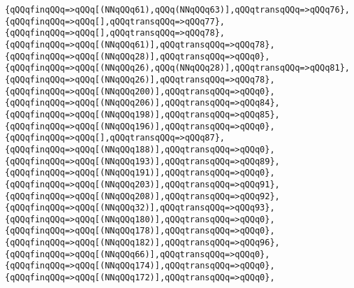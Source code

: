 \verb|{qQQqfinqQQq=>qQQq[(NNqQQq61),qQQq(NNqQQq63)],qQQqtransqQQq=>qQQq76},|\newline
\verb|{qQQqfinqQQq=>qQQq[],qQQqtransqQQq=>qQQq77},|\newline
\verb|{qQQqfinqQQq=>qQQq[],qQQqtransqQQq=>qQQq78},|\newline
\verb|{qQQqfinqQQq=>qQQq[(NNqQQq61)],qQQqtransqQQq=>qQQq78},|\newline
\verb|{qQQqfinqQQq=>qQQq[(NNqQQq28)],qQQqtransqQQq=>qQQq0},|\newline
\verb|{qQQqfinqQQq=>qQQq[(NNqQQq26),qQQq(NNqQQq28)],qQQqtransqQQq=>qQQq81},|\newline
\verb|{qQQqfinqQQq=>qQQq[(NNqQQq26)],qQQqtransqQQq=>qQQq78},|\newline
\verb|{qQQqfinqQQq=>qQQq[(NNqQQq200)],qQQqtransqQQq=>qQQq0},|\newline
\verb|{qQQqfinqQQq=>qQQq[(NNqQQq206)],qQQqtransqQQq=>qQQq84},|\newline
\verb|{qQQqfinqQQq=>qQQq[(NNqQQq198)],qQQqtransqQQq=>qQQq85},|\newline
\verb|{qQQqfinqQQq=>qQQq[(NNqQQq196)],qQQqtransqQQq=>qQQq0},|\newline
\verb|{qQQqfinqQQq=>qQQq[],qQQqtransqQQq=>qQQq87},|\newline
\verb|{qQQqfinqQQq=>qQQq[(NNqQQq188)],qQQqtransqQQq=>qQQq0},|\newline
\verb|{qQQqfinqQQq=>qQQq[(NNqQQq193)],qQQqtransqQQq=>qQQq89},|\newline
\verb|{qQQqfinqQQq=>qQQq[(NNqQQq191)],qQQqtransqQQq=>qQQq0},|\newline
\verb|{qQQqfinqQQq=>qQQq[(NNqQQq203)],qQQqtransqQQq=>qQQq91},|\newline
\verb|{qQQqfinqQQq=>qQQq[(NNqQQq208)],qQQqtransqQQq=>qQQq92},|\newline
\verb|{qQQqfinqQQq=>qQQq[(NNqQQq32)],qQQqtransqQQq=>qQQq93},|\newline
\verb|{qQQqfinqQQq=>qQQq[(NNqQQq180)],qQQqtransqQQq=>qQQq0},|\newline
\verb|{qQQqfinqQQq=>qQQq[(NNqQQq178)],qQQqtransqQQq=>qQQq0},|\newline
\verb|{qQQqfinqQQq=>qQQq[(NNqQQq182)],qQQqtransqQQq=>qQQq96},|\newline
\verb|{qQQqfinqQQq=>qQQq[(NNqQQq66)],qQQqtransqQQq=>qQQq0},|\newline
\verb|{qQQqfinqQQq=>qQQq[(NNqQQq174)],qQQqtransqQQq=>qQQq0},|\newline
\verb|{qQQqfinqQQq=>qQQq[(NNqQQq172)],qQQqtransqQQq=>qQQq0},|\newline
